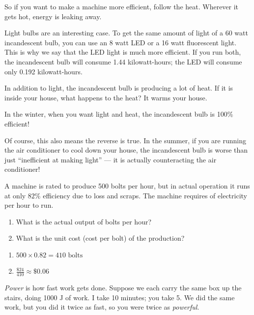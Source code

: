 So if you want to make a machine more efficient, follow the heat. Wherever it gets hot, energy is leaking away.

Light bulbs are an interesting case. To get the same amount of light of a 60 watt 
incandescent bulb, you can use an 8 watt LED or a 16 watt fluorescent light. This 
is why we say that the LED light is much more efficient. If you run both, the 
incandescent bulb will consume 1.44 kilowatt-hours; the LED will consume only 
0.192 kilowatt-hours. 

In addition to light, the incandescent bulb is producing a lot of heat. If it
is inside your house, what happens to the heat? It warms your house.

In the winter, when you want light and heat, the incandescent bulb is
100\% efficient!

Of course, this also means the reverse is true. In the summer, if you are running 
the air conditioner to cool down your house, the incandescent bulb is worse than 
just ``inefficient at making light'' --- it is actually counteracting the air 
conditioner!

\begin{Exercise}[title=Unit Costs, label=efficiency1]
A machine is rated to produce 500 bolts per hour, but in actual operation it runs at only $82\%$ efficiency due to loss and scraps.
The machine requires  of electricity per hour to run.
\begin{enumerate}[label=(\alph*)]
  \item What is the actual output of bolts per hour?
  \item What is the unit cost (cost per bolt) of the production?
\end{enumerate}

\end{Exercise}
\begin{Answer}[ref=efficiency1]
  \begin{enumerate}[label=(\alph*)]
    \item $500 \times 0.82 = 410 \text{ bolts}$
    \item $\frac{\mathdollar24}{410} \approx \mathdollar 0.06$
  \end{enumerate}
\end{Answer}

\emph{Power} is how fast work gets done. Suppose we each carry the same box up the stairs, doing 1000 J of work. I take 10 minutes; you take 5. We did the same work, but you did it twice as fast, so you were twice as \emph{powerful}.

